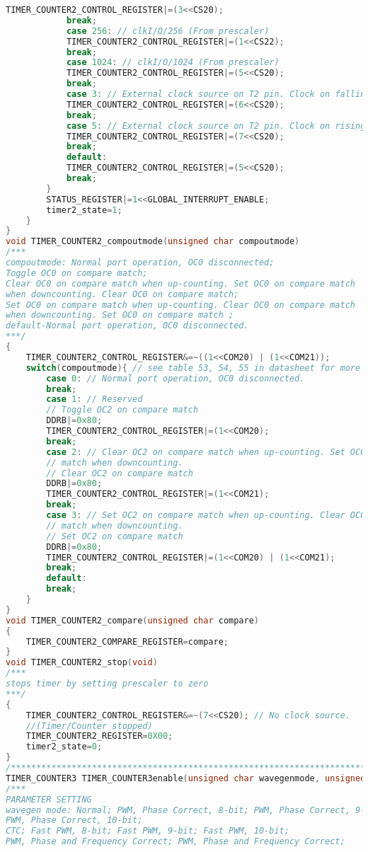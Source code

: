 \begin{lstlisting}[language=C]
			TIMER_COUNTER2_CONTROL_REGISTER|=(3<<CS20);
			break;
			case 256: // clkI/O/256 (From prescaler)
			TIMER_COUNTER2_CONTROL_REGISTER|=(1<<CS22);
			break;
			case 1024: // clkI/O/1024 (From prescaler)
			TIMER_COUNTER2_CONTROL_REGISTER|=(5<<CS20);
			break;
			case 3: // External clock source on T2 pin. Clock on falling edge
			TIMER_COUNTER2_CONTROL_REGISTER|=(6<<CS20);
			break;
			case 5: // External clock source on T2 pin. Clock on rising edge
			TIMER_COUNTER2_CONTROL_REGISTER|=(7<<CS20);
			break;
			default:
			TIMER_COUNTER2_CONTROL_REGISTER|=(5<<CS20);
			break;
		}
		STATUS_REGISTER|=1<<GLOBAL_INTERRUPT_ENABLE;
		timer2_state=1;
	}	
}
void TIMER_COUNTER2_compoutmode(unsigned char compoutmode)
/***
compoutmode: Normal port operation, OC0 disconnected;
Toggle OC0 on compare match; 
Clear OC0 on compare match when up-counting. Set OC0 on compare match
when downcounting. Clear OC0 on compare match;
Set OC0 on compare match when up-counting. Clear OC0 on compare match
when downcounting. Set OC0 on compare match ;
default-Normal port operation, OC0 disconnected.
***/
{
	TIMER_COUNTER2_CONTROL_REGISTER&=~((1<<COM20) | (1<<COM21));
	switch(compoutmode){ // see table 53, 54, 55 in datasheet for more information
		case 0: // Normal port operation, OC0 disconnected.
		break;
		case 1: // Reserved
		// Toggle OC2 on compare match
		DDRB|=0x80;
		TIMER_COUNTER2_CONTROL_REGISTER|=(1<<COM20);
		break;
		case 2: // Clear OC2 on compare match when up-counting. Set OC0 on compare
		// match when downcounting.
		// Clear OC2 on compare match
		DDRB|=0x80;
		TIMER_COUNTER2_CONTROL_REGISTER|=(1<<COM21);
		break;
		case 3: // Set OC2 on compare match when up-counting. Clear OC0 on compare
		// match when downcounting.
		// Set OC2 on compare match
		DDRB|=0x80;
		TIMER_COUNTER2_CONTROL_REGISTER|=(1<<COM20) | (1<<COM21);
		break;
		default:
		break;
	}
}
void TIMER_COUNTER2_compare(unsigned char compare)
{
	TIMER_COUNTER2_COMPARE_REGISTER=compare;
}
void TIMER_COUNTER2_stop(void)
/***
stops timer by setting prescaler to zero
***/
{
	TIMER_COUNTER2_CONTROL_REGISTER&=~(7<<CS20); // No clock source.
	//(Timer/Counter stopped)
	TIMER_COUNTER2_REGISTER=0X00;
	timer2_state=0;
}
/*****************************************************************************************/
TIMER_COUNTER3 TIMER_COUNTER3enable(unsigned char wavegenmode, unsigned char interrupt)
/***
PARAMETER SETTING
wavegen mode: Normal; PWM, Phase Correct, 8-bit; PWM, Phase Correct, 9-bit;
PWM, Phase Correct, 10-bit;
CTC; Fast PWM, 8-bit; Fast PWM, 9-bit; Fast PWM, 10-bit;
PWM, Phase and Frequency Correct; PWM, Phase and Frequency Correct;

\end{lstlisting}
